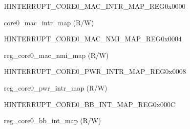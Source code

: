 \begin{register}{H}{INTERRUPT\_CORE0\_MAC\_INTR\_MAP\_REG}{0x0000}\label{regdesc:INTERRUPTCORE0MACINTRMAPREG}
%
%
\regnewline%
\begin{regdesc}\begin{reglist}
\label{fielddesc:INTERRUPTCORE0MACINTRMAP}\item [INTERRUPT\_CORE0\_MAC\_INTR\_MAP] core0\_mac\_intr\_map (R/W)
\end{reglist}\end{regdesc}
\end{register}


\begin{register}{H}{INTERRUPT\_CORE0\_MAC\_NMI\_MAP\_REG}{0x0004}\label{regdesc:INTERRUPTCORE0MACNMIMAPREG}
%
%
\regnewline%
\begin{regdesc}\begin{reglist}
\label{fielddesc:INTERRUPTCORE0MACNMIMAP}\item [INTERRUPT\_CORE0\_MAC\_NMI\_MAP] reg\_core0\_mac\_nmi\_map (R/W)
\end{reglist}\end{regdesc}
\end{register}


\begin{register}{H}{INTERRUPT\_CORE0\_PWR\_INTR\_MAP\_REG}{0x0008}\label{regdesc:INTERRUPTCORE0PWRINTRMAPREG}
%
%
\regnewline%
\begin{regdesc}\begin{reglist}
\label{fielddesc:INTERRUPTCORE0PWRINTRMAP}\item [INTERRUPT\_CORE0\_PWR\_INTR\_MAP] reg\_core0\_pwr\_intr\_map (R/W)
\end{reglist}\end{regdesc}
\end{register}


\begin{register}{H}{INTERRUPT\_CORE0\_BB\_INT\_MAP\_REG}{0x000C}\label{regdesc:INTERRUPTCORE0BBINTMAPREG}
%
%
\regnewline%
\begin{regdesc}\begin{reglist}
\label{fielddesc:INTERRUPTCORE0BBINTMAP}\item [INTERRUPT\_CORE0\_BB\_INT\_MAP] reg\_core0\_bb\_int\_map (R/W)
\end{reglist}\end{regdesc}
\end{register}


